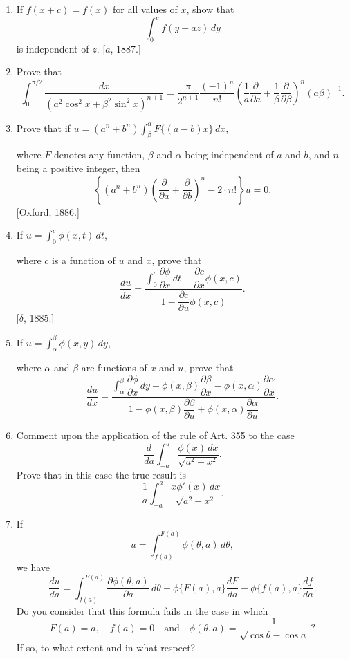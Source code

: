 \documentclass[11pt, a4paper]{article}
\newcommand{\source}[1]{\hfill\textnormal{[#1]}}
\begin{document}
\begin{enumerate}[leftmargin=2em]
\item If $f(x+c)=f(x)$ for all values of $x$, show that
\[
\int_0^c f(y+az)\,dy
\]
is independent of $z$. \source{$a$, 1887.}

\item Prove that
\[
\int_0^{\pi/2}\frac{dx}{(a^2\cos^2x+\beta^2\sin^2x)^{n+1}}=\frac{\pi}{2^{n+1}}\frac{(-1)^n}{n!}\left(\frac1a\frac{\partial}{\partial a}+\frac1\beta\frac{\partial}{\partial\beta}\right)^n(a\beta)^{-1}.
\]

\item Prove that if $u=(a^n+b^n)\displaystyle\int_\beta^\alpha F\{(a-b)x\}\,dx$,

where $F$ denotes any function, $\beta$ and $\alpha$ being independent of $a$ and $b$, and $n$ being a positive integer, then
\[
\left\{(a^n+b^n)\left(\frac{\partial}{\partial a}+\frac{\partial}{\partial b}\right)^n-2\cdot n!\right\}u=0.
\]
\source{Oxford, 1886.}

\item If $u=\displaystyle\int_0^c\phi(x,t)\,dt$,

where $c$ is a function of $u$ and $x$, prove that
\[
\frac{du}{dx}=\frac{\displaystyle\int_0^c\dfrac{\partial\phi}{\partial x}\,dt+\dfrac{\partial c}{\partial x}\phi(x,c)}{1-\dfrac{\partial c}{\partial u}\phi(x,c)}.
\]
\source{$\delta$, 1885.}

\item If $u=\displaystyle\int_\alpha^\beta\phi(x,y)\,dy$,

where $\alpha$ and $\beta$ are functions of $x$ and $u$, prove that
\[
\frac{du}{dx}=\frac{\displaystyle\int_\alpha^\beta\dfrac{\partial\phi}{\partial x}\,dy+\phi(x,\beta)\dfrac{\partial\beta}{\partial x}-\phi(x,\alpha)\dfrac{\partial\alpha}{\partial x}}{1-\phi(x,\beta)\dfrac{\partial\beta}{\partial u}+\phi(x,\alpha)\dfrac{\partial\alpha}{\partial u}}.
\]

\item Comment upon the application of the rule of Art. 355 to the case
\[
\frac{d}{da}\int_{-a}^a\frac{\phi(x)\,dx}{\sqrt{a^2-x^2}}.
\]
Prove that in this case the true result is
\[
\frac1a\int_{-a}^a\frac{x\phi'(x)\,dx}{\sqrt{a^2-x^2}}.
\]

\item If
\[
u=\int_{f(a)}^{F(a)}\phi(\theta,a)\,d\theta,
\]
we have
\[
\frac{du}{da}=\int_{f(a)}^{F(a)}\frac{\partial\phi(\theta,a)}{\partial a}\,d\theta+\phi\{F(a),a\}\frac{dF}{da}-\phi\{f(a),a\}\frac{df}{da}.
\]
Do you consider that this formula fails in the case in which
\[
F(a)=a,\quad f(a)=0\quad\text{and}\quad\phi(\theta,a)=\frac{1}{\sqrt{\cos\theta-\cos a}}\ ?
\]
If so, to what extent and in what respect?


\end{enumerate}
\end{document}
